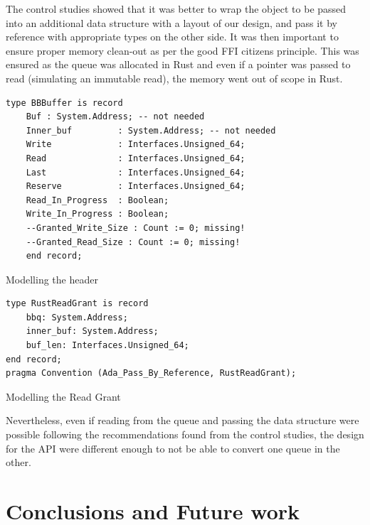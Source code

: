\documentclass[nomenclature, english, bibtex]{kththesis}
\begin{document}
The control studies showed that it was better to wrap the object to be passed into an additional data structure with a layout of our design, and pass it by reference with appropriate types on the other side. It was then important to ensure proper memory clean-out as per the good FFI citizens principle. This was ensured as the queue was allocated in Rust and even if a pointer was passed to read (simulating an immutable read), the memory went out of scope in Rust.

\begin{listing}[ht!]
\begin{verbatim}
type BBBuffer is record
    Buf : System.Address; -- not needed
    Inner_buf         : System.Address; -- not needed
    Write             : Interfaces.Unsigned_64;
    Read              : Interfaces.Unsigned_64;
    Last              : Interfaces.Unsigned_64;
    Reserve           : Interfaces.Unsigned_64;
    Read_In_Progress  : Boolean;
    Write_In_Progress : Boolean;
    --Granted_Write_Size : Count := 0; missing!
    --Granted_Read_Size : Count := 0; missing!
    end record;
\end{verbatim}
\caption{Modelling the header}
\label{lst:bbqueueheaderinspark}
\end{listing}
\FloatBarrier


\begin{listing}[ht!]
\begin{verbatim}
type RustReadGrant is record
    bbq: System.Address;
    inner_buf: System.Address;
    buf_len: Interfaces.Unsigned_64;
end record;
pragma Convention (Ada_Pass_By_Reference, RustReadGrant);
\end{verbatim}
\caption{Modelling the Read Grant}
\label{lst:bbqueuereadgrantinspark}
\end{listing}
\FloatBarrier




Nevertheless, even if reading from the queue and passing the data structure were possible following the recommendations found from the control studies, the design for the API were different enough to not be able to convert one queue in the other.

\cleardoublepage

\chapter{Conclusions and Future work}
\label{ch:conclusionsAndFutureWork}
\end{document}
